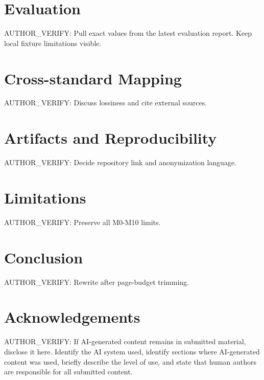 \documentclass[conference,10pt]{IEEEtran}
\begin{document}
\section{Evaluation}
AUTHOR\_VERIFY: Pull exact values from the latest evaluation report. Keep local
fixture limitations visible.

\section{Cross-standard Mapping}
AUTHOR\_VERIFY: Discuss lossiness and cite external sources.

\section{Artifacts and Reproducibility}
AUTHOR\_VERIFY: Decide repository link and anonymization language.

\section{Limitations}
AUTHOR\_VERIFY: Preserve all M0-M10 limits.

\section{Conclusion}
AUTHOR\_VERIFY: Rewrite after page-budget trimming.

\section*{Acknowledgements}
AUTHOR\_VERIFY: If AI-generated content remains in submitted material, disclose
it here. Identify the AI system used, identify sections where AI-generated
content was used, briefly describe the level of use, and state that human
authors are responsible for all submitted content.



\end{document}
